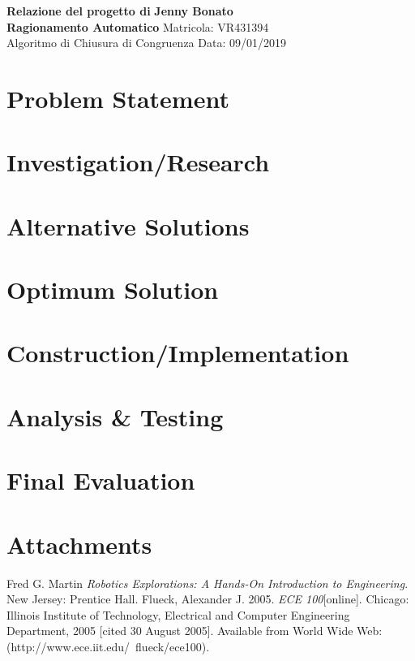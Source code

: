 \documentclass[a4paper, 11pt]{article}
\begin{document}
\noindent
\large\textbf{Relazione del progetto di} \hfill \textbf{Jenny Bonato} \\
\large\textbf{Ragionamento Automatico} \hfill Matricola: VR431394 \\
Algoritmo di Chiusura di Congruenza \hfill Data: 09/01/2019 \\

\section*{Problem Statement}

\section*{Investigation/Research}

\section*{Alternative Solutions}

\section*{Optimum Solution}

\section*{Construction/Implementation}

\section*{Analysis \& Testing}

\section*{Final Evaluation}

\section*{Attachments}

\begin{thebibliography}{9}
 Fred G. Martin \emph{Robotics Explorations: A Hands-On Introduction to Engineering}. New Jersey: Prentice Hall.
  Flueck, Alexander J. 2005. \emph{ECE 100}[online]. Chicago: Illinois Institute of Technology, Electrical and Computer Engineering Department, 2005 [cited 30
August 2005]. Available from World Wide Web: (http://www.ece.iit.edu/~flueck/ece100).
\end{thebibliography}
\end{document}
